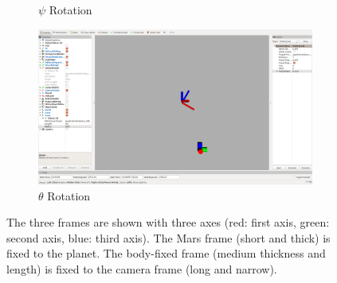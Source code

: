 \documentclass[conf]{new-aiaa}
\begin{document}
\begin{figure}[!t]
\begin{subfigure}[t]{0.3\columnwidth}
        		\caption{$\psi$ Rotation}
    	\end{subfigure}
	\begin{subfigure}[t]{0.3\columnwidth}
           	\centering
          	\includegraphics[trim = {23cm 4cm 17cm 6cm}, clip, height=1.0\textwidth]{mars_theta.png}
        		\caption{$\theta$ Rotation}
    	\end{subfigure}
\caption{The three frames are shown with three axes (red: first axis, green: second axis, blue: third axis). The Mars frame (short and thick) is fixed to the planet. The body-fixed frame (medium thickness and length) is fixed to the camera frame (long and narrow).}
\label{fig:transforms}
\end{figure}
\end{document}

